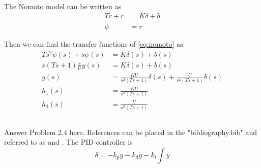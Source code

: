 The Nomoto model can be written as
\begin{equation}
\label{eq:nomoto}
	\begin{aligned}
		T \dot{r} + r &= K \delta + b \\
		\dot{\psi} &= r
	\end{aligned}
\end{equation}

Then we can find the transfer functions of \eqref{eq:nomoto} as: 
\begin{align*}
	T s^2 \psi(s) + s \psi(s) &= K \delta(s) + b(s) \\
	s(T s + 1) \frac{s}{U} y(s) &= K \delta(s) + b(s) \\
	y(s) &= \frac{K U}{s^2 (T s + 1)} \delta(s) + \frac{U}{s^2 (T s + 1)} b(s) \\ 
	h_1(s) &= \frac{K U}{s^2 (T s + 1)} \\
	h_2(s) &= \frac{U}{s^2 (T s + 1)}
\end{align*}

\subsection{}
Answer Problem 2.4 here.  References can be placed in the "bibliography.bib" and referred to as \cite{Fossen2011} and \cite{Fjellstad1994857}. The PID-controller is
\begin{equation}
	\delta = -k_p y - k_d \dot{y} - k_i \int y
\end{equation}
